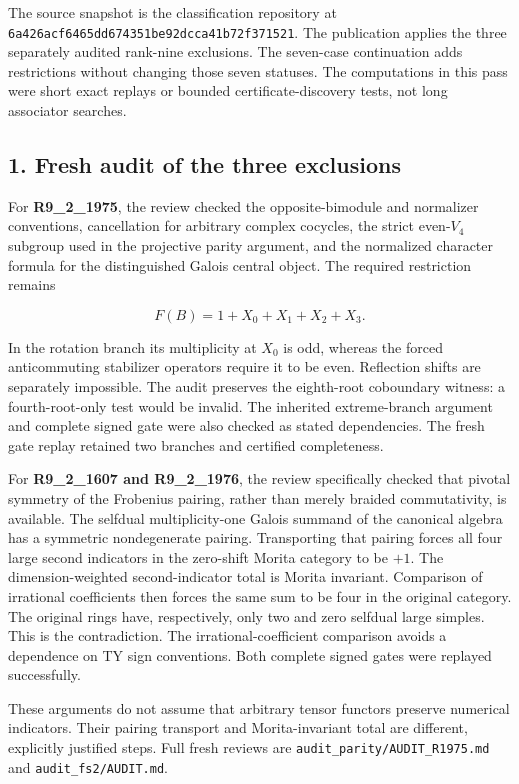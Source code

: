 \documentclass[
  11pt,
]{article}
\begin{document}
The source snapshot is the classification repository at
\texttt{6a426acf6465dd674351be92dcca41b72f371521}. The publication
applies the three separately audited rank-nine exclusions. The
seven-case continuation adds restrictions without changing those seven
statuses. The computations in this pass were short exact replays or
bounded certificate-discovery tests, not long associator searches.

\hypertarget{fresh-audit-of-the-three-exclusions}{%
\subsection{1. Fresh audit of the three
exclusions}\label{fresh-audit-of-the-three-exclusions}}

For \textbf{R9\_2\_1975}, the review checked the opposite-bimodule and
normalizer conventions, cancellation for arbitrary complex cocycles, the
strict even-\(V_4\) subgroup used in the projective parity argument, and
the normalized character formula for the distinguished Galois central
object. The required restriction remains

\[
F(B)=1+X_0+X_1+X_2+X_3.
\]

In the rotation branch its multiplicity at \(X_0\) is odd, whereas the
forced anticommuting stabilizer operators require it to be even.
Reflection shifts are separately impossible. The audit preserves the
eighth-root coboundary witness: a fourth-root-only test would be
invalid. The inherited extreme-branch argument and complete signed gate
were also checked as stated dependencies. The fresh gate replay retained
two branches and certified completeness.

For \textbf{R9\_2\_1607 and R9\_2\_1976}, the review specifically
checked that pivotal symmetry of the Frobenius pairing, rather than
merely braided commutativity, is available. The selfdual
multiplicity-one Galois summand of the canonical algebra has a symmetric
nondegenerate pairing. Transporting that pairing forces all four large
second indicators in the zero-shift Morita category to be \(+1\). The
dimension-weighted second-indicator total is Morita invariant.
Comparison of irrational coefficients then forces the same sum to be
four in the original category. The original rings have, respectively,
only two and zero selfdual large simples. This is the contradiction. The
irrational-coefficient comparison avoids a dependence on TY sign
conventions. Both complete signed gates were replayed successfully.

These arguments do not assume that arbitrary tensor functors preserve
numerical indicators. Their pairing transport and Morita-invariant total
are different, explicitly justified steps. Full fresh reviews are
\texttt{audit\_parity/AUDIT\_R1975.md} and \texttt{audit\_fs2/AUDIT.md}.
\end{document}
